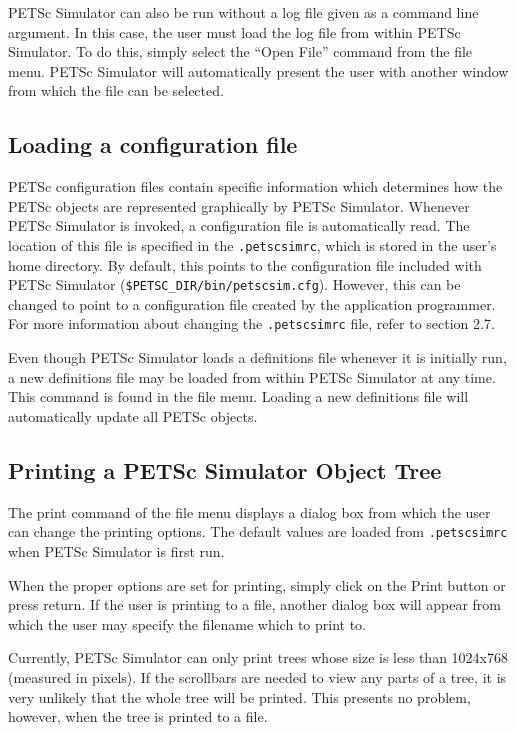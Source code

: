 PETSc Simulator can also be run without a log file given as a command line argument.  In this case, the user must load the log file from within PETSc Simulator.  To do this, simply select the ``Open File'' command from the file menu.  PETSc Simulator will automatically present the user with another window from which the file can be selected.

\subsection{Loading a configuration file}

PETSc configuration files contain specific information which determines how the PETSc objects are represented graphically by PETSc Simulator.  Whenever PETSc Simulator is invoked, a configuration file is automatically read.  The location of this file is specified in the {\tt .petscsimrc}, which is stored in the user's home directory.  By default, this points to the configuration file included with PETSc Simulator ({\tt \$PETSC\_DIR/bin/petscsim.cfg}).  However, this can be changed to point to a configuration file created by the application programmer.  For more information about changing the {\tt .petscsimrc} file, refer to section 2.7.

Even though PETSc Simulator loads a definitions file whenever it is initially run, a new definitions file may be loaded from within PETSc Simulator at any time.  This command is found in the file menu.  Loading a new definitions file will automatically update all PETSc objects.

\subsection{Printing a PETSc Simulator Object Tree}

The print command of the file menu displays a dialog box from which the user can change the printing options.  The default values are loaded from {\tt .petscsimrc} when PETSc Simulator is first run.

When the proper options are set for printing, simply click on the Print button or press return.  If the user is printing to a file, another dialog box will appear from which the user may specify the filename which to print to.

\begin{note}
Currently, PETSc Simulator can only print trees whose size is less than 1024x768 (measured in pixels).  If the scrollbars are needed to view any parts of a tree, it is very unlikely that the whole tree will be printed.  This presents no problem, however, when the tree is printed to a file.
\end{note}

